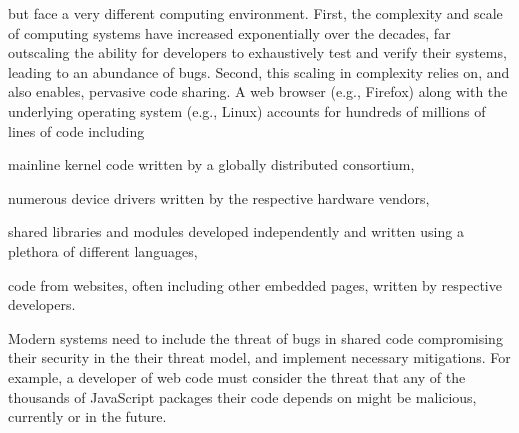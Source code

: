 but face a very different computing environment.
First, the complexity and scale of computing systems have increased 
exponentially over the decades, far outscaling the ability for developers to 
exhaustively test and verify their systems, leading to an abundance of bugs.
Second, this scaling in complexity relies on, and also enables, pervasive code
sharing.
A web browser (e.g., Firefox) along with the underlying operating 
system (e.g., Linux) accounts for hundreds of millions of lines of code
including
\begin{inparaenum}
      \item mainline kernel code written by a globally distributed consortium,
      \item numerous device drivers written by the respective hardware 
            vendors,
      \item shared libraries and modules developed independently and 
            written using a plethora of different languages,
      \item code from websites, often including other embedded pages,
            written by respective developers.
\end{inparaenum}
Modern systems need to include the threat of bugs in shared code
compromising their security in the their threat model, and implement
necessary mitigations.
For example, a developer of web code must consider the threat that any of the
thousands of JavaScript packages their code depends on might be malicious,
currently or in the future.


